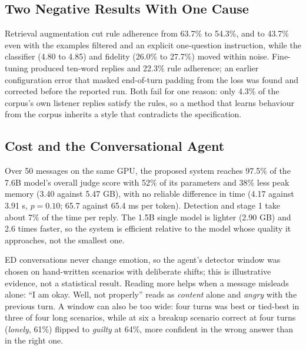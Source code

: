 \subsection{Two Negative Results With One Cause}
Retrieval augmentation cut rule adherence from 63.7\% to 54.3\%, and to 43.7\% even with the examples filtered and an explicit one-question instruction, while the classifier (4.80 to 4.85) and fidelity (26.0\% to 27.7\%) moved within noise. Fine-tuning produced ten-word replies and 22.3\% rule adherence; an earlier configuration error that masked end-of-turn padding from the loss was found and corrected before the reported run. Both fail for one reason: only 4.3\% of the corpus's own listener replies satisfy the rules, so a method that learns behaviour from the corpus inherits a style that contradicts the specification.

\subsection{Cost and the Conversational Agent}
Over 50 messages on the same GPU, the proposed system reaches 97.5\% of the 7.6B model's overall judge score with 52\% of its parameters and 38\% less peak memory (3.40 against 5.47 GB), with no reliable difference in time (4.17 against 3.91 s, $p=0.10$; 65.7 against 65.4 ms per token). Detection and stage 1 take about 7\% of the time per reply. The 1.5B single model is lighter (2.90 GB) and 2.6 times faster, so the system is efficient relative to the model whose quality it approaches, not the smallest one.

ED conversations never change emotion, so the agent's detector window was chosen on hand-written scenarios with deliberate shifts; this is illustrative evidence, not a statistical result. Reading more helps when a message misleads alone: ``I am okay. Well, not properly'' reads as \textit{content} alone and \textit{angry} with the previous turn. A window can also be too wide: four turns was best or tied-best in three of four long scenarios, while at six a breakup scenario correct at four turns (\textit{lonely}, 61\%) flipped to \textit{guilty} at 64\%, more confident in the wrong answer than in the right one.

